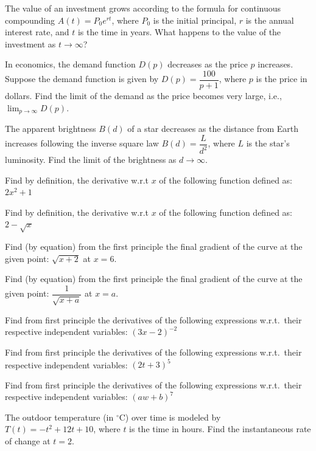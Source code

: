 \documentclass[11pt,a4paper]{article}
\begin{document}
\begin{longlist}
\item The value of an investment grows according to the formula for continuous compounding $A(t) = P_0e^{rt}$, where $P_0$ is the initial principal, $r$ is the annual interest rate, and $t$ is the time in years. What happens to the value of the investment as $t\to\infty$?

\item In economics, the demand function $D(p)$ decreases as the price $p$ increases. Suppose the demand function is given by $D(p) = \dfrac{100}{p+1}$, where $p$ is the price in dollars. Find the limit of the demand as the price becomes very large, i.e., $\displaystyle\lim_{p\to\infty} D(p)$.

\item The apparent brightness $B(d)$ of a star decreases as the distance from Earth increases following the inverse square law $B(d) = \dfrac{L}{d^2}$, where $L$ is the star's luminosity. Find the limit of the brightness as $d\to\infty$.

\item Find by definition, the derivative w.r.t $x$ of the following function defined as: $2x^2+1$

\item Find by definition, the derivative w.r.t $x$ of the following function defined as: $2-\sqrt{x}$

\item Find (by equation) from the first principle the final gradient of the curve at the given point: $\sqrt{x+2}$ at $x=6$.

\item Find (by equation) from the first principle the final gradient of the curve at the given point: $\dfrac{1}{\sqrt{x+a}}$ at $x=a$.

\item Find from first principle the derivatives of the following expressions w.r.t.\ their respective independent variables: $(3x-2)^{-2}$

\item Find from first principle the derivatives of the following expressions w.r.t.\ their respective independent variables: $(2t+3)^5$

\item Find from first principle the derivatives of the following expressions w.r.t.\ their respective independent variables: $(aw+b)^7$

\item The outdoor temperature (in $^\circ$C) over time is modeled by $T(t)=-t^2+12t+10$, where $t$ is the time in hours. Find the instantaneous rate of change at $t=2$.


\end{longlist}
\end{document}
